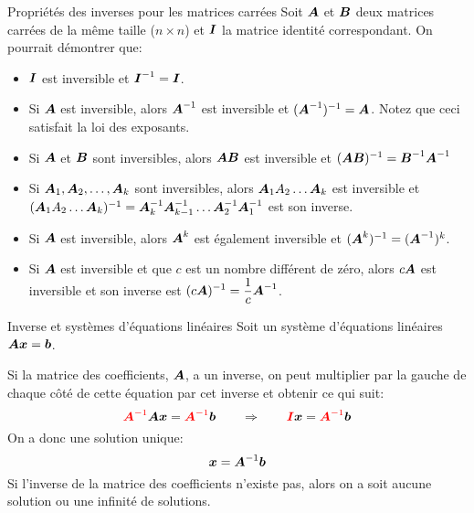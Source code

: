 \documentclass[french]{beamer}
\begin{document}
\begin{frame}{Propriétés des inverses pour les matrices carrées}
 Soit $\boldsymbol{A}$ et $\boldsymbol{B}$ deux matrices carrées de la même taille ($n\times n$) et $\boldsymbol{I}$ la matrice identité correspondant. On pourrait démontrer que:
\begin{itemize}
\item  $\boldsymbol{I}$ est inversible et $\boldsymbol{I}^{-1} = \boldsymbol{I}$.
\item Si $\boldsymbol{A}$ est inversible, alors $\boldsymbol{A}^{-1}$ est inversible et $(\boldsymbol{A}^{-1})^{-1} = \boldsymbol{A}$. Notez que ceci satisfait la loi des exposants.
\item Si $\boldsymbol{A}$ et $\boldsymbol{B}$ sont inversibles, alors $\boldsymbol{A}\boldsymbol{B}$ est inversible et $(\boldsymbol{A}\boldsymbol{B})^{-1} = \boldsymbol{B}^{-1}\boldsymbol{A}^{-1}$
\item Si $\boldsymbol{A}_1, \boldsymbol{A}_2, \ldots, \boldsymbol{A}_k$ sont inversibles, alors $\boldsymbol{A}_1A_2 \ldots \boldsymbol{A}_k$ est inversible et $(\boldsymbol{A}_1A_2 \ldots \boldsymbol{A}_k)^{-1} = \boldsymbol{A}_k^{-1}\boldsymbol{A}_{k-1}^{-1}\ldots \boldsymbol{A}_2^{-1}\boldsymbol{A}_1^{-1}$ est son inverse.
\item  Si $\boldsymbol{A}$ est inversible, alors $\boldsymbol{A}^k$ est également inversible et $(\boldsymbol{A}^k)^{-1} = (\boldsymbol{A}^{-1})^k$.
\item Si $\boldsymbol{A}$ est inversible et que $c$ est un nombre
 différent de zéro, alors $c\boldsymbol{A}$ est inversible et son
 inverse est $\displaystyle (c\boldsymbol{A})^{-1} = \frac{1}{c}\boldsymbol{A}^{-1}$.
\end{itemize}  

\end{frame}

\begin{frame}{Inverse et systèmes d'équations linéaires}
Soit un système d'équations linéaires $\boldsymbol{A}\boldsymbol{x} = \boldsymbol{b}$.

Si la matrice des coefficients, $\boldsymbol{A}$, a un inverse, on peut multiplier par la gauche de chaque côté de cette équation par cet inverse et obtenir ce qui suit:
\[
{\color{red}\boldsymbol{A}^{-1}} \boldsymbol{A} \boldsymbol{x} =
{\color{red}\boldsymbol{A}^{-1}} \boldsymbol{b}
\qquad \Rightarrow \qquad 
{\color{red}\boldsymbol{I}} \boldsymbol{x} = 
{\color{red}\boldsymbol{A}^{-1}} \boldsymbol{b}
\]
On a donc une solution unique:
\[
\boldsymbol{x} = \boldsymbol{A}^{-1} \boldsymbol{b}
\]
Si l'inverse de la matrice des coefficients n'existe pas,
alors on a soit aucune solution ou une infinité de solutions.
\end{frame}
\end{document}
